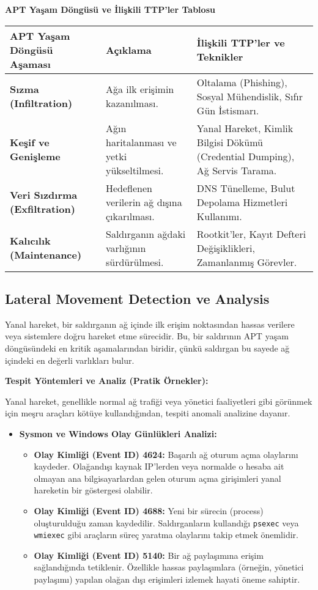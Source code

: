 \textbf{APT Yaşam Döngüsü ve İlişkili TTP'ler Tablosu}

\begin{tabularx}{\textwidth}{|l|X|X|}
\hline
\textbf{APT Yaşam Döngüsü Aşaması} & \textbf{Açıklama} & \textbf{İlişkili TTP'ler ve Teknikler} \\
\hline
\textbf{Sızma (Infiltration)} & Ağa ilk erişimin kazanılması. & Oltalama (Phishing), Sosyal Mühendislik, Sıfır Gün İstismarı. \\
\hline
\textbf{Keşif ve Genişleme} & Ağın haritalanması ve yetki yükseltilmesi. & Yanal Hareket, Kimlik Bilgisi Dökümü (Credential Dumping), Ağ Servis Tarama. \\
\hline
\textbf{Veri Sızdırma (Exfiltration)} & Hedeflenen verilerin ağ dışına çıkarılması. & DNS Tünelleme, Bulut Depolama Hizmetleri Kullanımı. \\
\hline
\textbf{Kalıcılık (Maintenance)} & Saldırganın ağdaki varlığının sürdürülmesi. & Rootkit'ler, Kayıt Defteri Değişiklikleri, Zamanlanmış Görevler. \\
\hline
\end{tabularx}

\subsection{Lateral Movement Detection ve Analysis}

Yanal hareket, bir saldırganın ağ içinde ilk erişim noktasından hassas verilere veya sistemlere doğru hareket etme sürecidir. Bu, bir saldırının APT yaşam döngüsündeki en kritik aşamalarından biridir, çünkü saldırgan bu sayede ağ içindeki en değerli varlıkları bulur.

\textbf{Tespit Yöntemleri ve Analiz (Pratik Örnekler):}

Yanal hareket, genellikle normal ağ trafiği veya yönetici faaliyetleri gibi görünmek için meşru araçları kötüye kullandığından, tespiti anomali analizine dayanır.

\begin{itemize}
    \item \textbf{Sysmon ve Windows Olay Günlükleri Analizi:}
    \begin{itemize}
        \item \textbf{Olay Kimliği (Event ID) 4624:} Başarılı ağ oturum açma olaylarını kaydeder. Olağandışı kaynak IP'lerden veya normalde o hesaba ait olmayan ana bilgisayarlardan gelen oturum açma girişimleri yanal hareketin bir göstergesi olabilir.
        \item \textbf{Olay Kimliği (Event ID) 4688:} Yeni bir sürecin (process) oluşturulduğu zaman kaydedilir. Saldırganların kullandığı \texttt{psexec} veya \texttt{wmiexec} gibi araçların süreç yaratma olaylarını takip etmek önemlidir.
        \item \textbf{Olay Kimliği (Event ID) 5140:} Bir ağ paylaşımına erişim sağlandığında tetiklenir. Özellikle hassas paylaşımlara (örneğin, yönetici paylaşımı) yapılan olağan dışı erişimleri izlemek hayati öneme sahiptir.
    \end{itemize}
\end{itemize}

